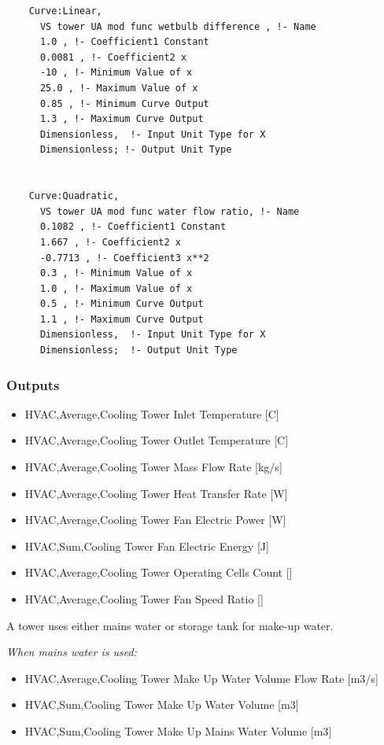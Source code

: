 \begin{lstlisting}
    Curve:Linear,
      VS tower UA mod func wetbulb difference , !- Name
      1.0 , !- Coefficient1 Constant
      0.0081 , !- Coefficient2 x
      -10 , !- Minimum Value of x
      25.0 , !- Maximum Value of x
      0.85 , !- Minimum Curve Output
      1.3 , !- Maximum Curve Output
      Dimensionless,  !- Input Unit Type for X
      Dimensionless; !- Output Unit Type


    Curve:Quadratic,
      VS tower UA mod func water flow ratio, !- Name
      0.1082 , !- Coefficient1 Constant
      1.667 , !- Coefficient2 x
      -0.7713 , !- Coefficient3 x**2
      0.3 , !- Minimum Value of x
      1.0 , !- Maximum Value of x
      0.5 , !- Minimum Curve Output
      1.1 , !- Maximum Curve Output
      Dimensionless,  !- Input Unit Type for X
      Dimensionless;  !- Output Unit Type
\end{lstlisting}

\subsubsection{Outputs}\label{outputs-2-003}

\begin{itemize}
\item
  HVAC,Average,Cooling Tower Inlet Temperature {[}C{]}
\item
  HVAC,Average,Cooling Tower Outlet Temperature {[}C{]}
\item
  HVAC,Average,Cooling Tower Mass Flow Rate {[}kg/s{]}
\item
  HVAC,Average,Cooling Tower Heat Transfer Rate {[}W{]}
\item
  HVAC,Average,Cooling Tower Fan Electric Power {[}W{]}
\item
  HVAC,Sum,Cooling Tower Fan Electric Energy {[}J{]}
\item
  HVAC,Average,Cooling Tower Operating Cells Count {[]}
\item
  HVAC,Average,Cooling Tower Fan Speed Ratio {[]}
\end{itemize}

A tower uses either mains water or storage tank for make-up water.

\emph{When mains water is used:}

\begin{itemize}
\item
  HVAC,Average,Cooling Tower Make Up Water Volume Flow Rate {[}m3/s{]}
\item
  HVAC,Sum,Cooling Tower Make Up Water Volume {[}m3{]}
\item
  HVAC,Sum,Cooling Tower Make Up Mains Water Volume {[}m3{]}
\end{itemize}

